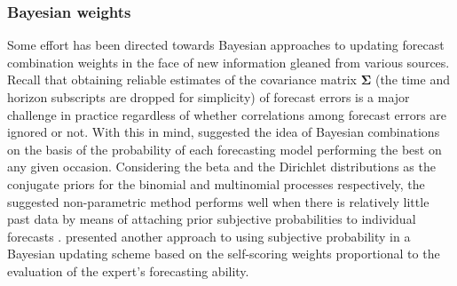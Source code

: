 \documentclass[11pt]{article}
\begin{document}
\subsubsection*{Bayesian weights}

Some effort has been directed towards Bayesian approaches to updating forecast combination weights in the face of new information gleaned from various sources. Recall that obtaining reliable estimates of the covariance matrix $\bm{\Sigma}$ (the time and horizon subscripts are dropped for simplicity) of forecast errors is a major challenge in practice regardless of whether correlations among forecast errors are ignored or not. With this in mind, \citet{Bunn1975-vz} suggested the idea of Bayesian combinations on the basis of the probability of each forecasting model performing the best on any given occasion. Considering the beta and the Dirichlet distributions as the conjugate priors for the binomial and multinomial processes respectively, the suggested non-parametric method performs well when there is relatively little past data by means of attaching prior subjective probabilities to individual forecasts \citep{Bunn1985-vo,De_Menezes2000-vd}. \citet{Oller1978-wx} presented another approach to using subjective probability in a Bayesian updating scheme based on the self-scoring weights proportional to the evaluation of the expert's forecasting ability.
\end{document}
